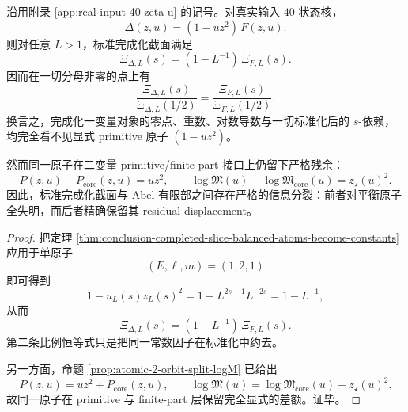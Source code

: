 \begin{theorem}\label{thm:conclusion-realinput40-completed-slice-atomblind-finitepart-visible}
沿用附录 \ref{app:real-input-40-zeta-u} 的记号。对真实输入 \(40\) 状态核，
\[
\Delta(z,u)=(1-uz^2)\,F(z,u).
\]
则对任意 \(L>1\)，标准完成化截面满足
\[
\Xi_{\Delta,L}(s)=(1-L^{-1})\,\Xi_{F,L}(s).
\]
因而在一切分母非零的点上有
\[
\frac{\Xi_{\Delta,L}(s)}{\Xi_{\Delta,L}(1/2)}
=
\frac{\Xi_{F,L}(s)}{\Xi_{F,L}(1/2)}.
\]
换言之，完成化一变量对象的零点、重数、对数导数与一切标准化后的 \(s\)-依赖，均完全看不见显式 primitive 原子 \((1-uz^2)\)。

然而同一原子在二变量 primitive/finite-part 接口上仍留下严格残余：
\[
P(z,u)-P_{\mathrm{core}}(z,u)=uz^2,
\qquad
\log\mathfrak M(u)-\log\mathfrak M_{\mathrm{core}}(u)=z_\star(u)^2.
\]
因此，标准完成化截面与 Abel 有限部之间存在严格的信息分裂：前者对平衡原子全失明，而后者精确保留其 residual displacement。
\end{theorem}
\begin{proof}
把定理 \ref{thm:conclusion-completed-slice-balanced-atoms-become-constants} 应用于单原子
\[
(E,\ell,m)=(1,2,1)
\]
即可得到
\[
1-u_L(s)z_L(s)^2
=
1-L^{2s-1}L^{-2s}
=
1-L^{-1},
\]
从而
\[
\Xi_{\Delta,L}(s)=(1-L^{-1})\,\Xi_{F,L}(s).
\]
第二条比例恒等式只是把同一常数因子在标准化中约去。

另一方面，命题 \ref{prop:atomic-2-orbit-split-logM} 已给出
\[
P(z,u)=uz^2+P_{\mathrm{core}}(z,u),
\qquad
\log\mathfrak M(u)=\log\mathfrak M_{\mathrm{core}}(u)+z_\star(u)^2.
\]
故同一原子在 primitive 与 finite-part 层保留完全显式的差额。证毕。
\end{proof}

